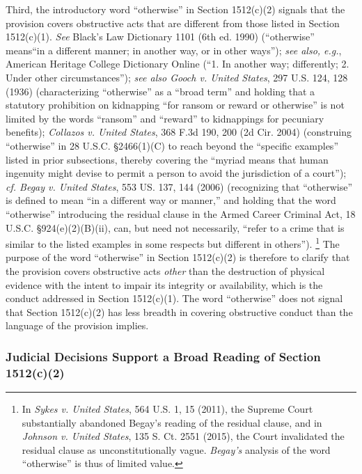 Third, the introductory word “otherwise” in Section 1512(c)(2) signals that the provision covers obstructive acts that are different from those listed in Section 1512(c)(1).
\textit{See} Black’s Law Dictionary 1101 (6th ed. 1990) (“otherwise” means“in a different manner; in another way, or in other ways”);
\textit{see also, e.g.}, American Heritage College Dictionary Online (“1. In another way; differently; 2. Under other circumstances”);
\textit{see also Gooch v. United States}, 297 U.S. 124, 128 (1936) (characterizing “otherwise” as a “broad term” and holding that a statutory prohibition on kidnapping “for ransom or reward or otherwise” is not limited by the words “ransom” and “reward” to kidnappings for pecuniary benefits);
\textit{Collazos v. United States}, 368 F.3d 190, 200 (2d Cir. 2004) (construing “otherwise” in 28 U.S.C. \S 2466(1)(C) to reach beyond the “specific examples” listed in prior subsections, thereby covering the “myriad means that human ingenuity might devise to permit a person to avoid the jurisdiction of a court”);
\textit{cf. Begay v. United States}, 553 US. 137, 144 (2006) (recognizing that “otherwise” is defined to mean “in a different way or manner,” and holding that the word “otherwise” introducing the residual clause in the Armed Career Criminal Act, 18 U.S.C. \S 924(e)(2)(B)(ii), can, but need not necessarily, “refer to a crime that is similar to the listed examples in some respects but different in others”).%
\footnote{In \textit{Sykes v. United States}, 564 U.S. 1, 15 (2011), the Supreme Court substantially abandoned Begay’s reading of the residual clause, and in \textit{Johnson v. United States}, 135 S. Ct. 2551 (2015), the Court invalidated the residual clause as unconstitutionally vague.
\textit{Begay’s} analysis of the word “otherwise” is thus of limited value.}
The purpose of the word “otherwise” in Section 1512(c)(2) is therefore to clarify that the provision covers obstructive acts \textit{other} than the destruction of physical evidence with the intent to impair its integrity or availability, which is the conduct addressed in Section 1512(c)(1).
The word “otherwise” does not signal that Section 1512(c)(2) has less breadth in covering obstructive conduct than the language of the provision implies.

\subsubsection{Judicial Decisions Support a Broad Reading of Section 1512(c)(2)}

